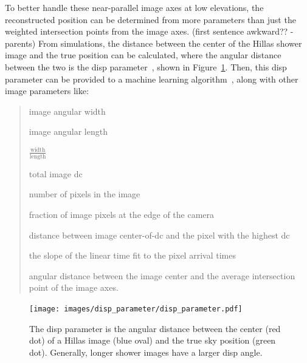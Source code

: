 To better handle these near-parallel image axes at low elevations, the reconstructed position can be determined from more parameters than just the weighted intersection points from the image axes.
{\color{red}(first sentence awkward?? -parents)}
From simulations, the distance between the center of the Hillas shower image and the true position can be calculated, where the angular distance between the two is the disp parameter~\cite{Senturk:2011}, shown in Figure~\ref{fig:dispdiagram}.
Then, this disp parameter can be provided to a machine learning algorithm~\cite{Beilicke2012NIM}, along with other image parameters like:
\begin{quote}
  \begin{description}[noitemsep]
    \item [width:] image angular width
    \item [length:] image angular length
    \item [wol:] $\frac{\textrm{width}}{\textrm{length}}$
    \item [size:] total image dc
    \item [ntubes:] number of pixels in the image
    \item [loss:] fraction of image pixels at the edge of the camera
    \item [asym:] distance between image center-of-dc and the pixel with the highest dc
    \item [tgrad:] the slope of the linear time fit to the pixel arrival times
    \item [cross:] angular distance between the image center and the average intersection point of the image axes.
  \end{description}
\end{quote}


\begin{figure}[t]
  \centering
  \texttt{[image: images/disp\_parameter/disp\_parameter.pdf]}
  \caption[Angular Reconstruction Disp]{
    The disp parameter is the angular distance between the center (red dot) of a Hillas image (blue oval) and the true sky position (green dot).
    Generally, longer shower images have a larger disp angle.
  }
  \label{fig:dispdiagram}
\end{figure}

